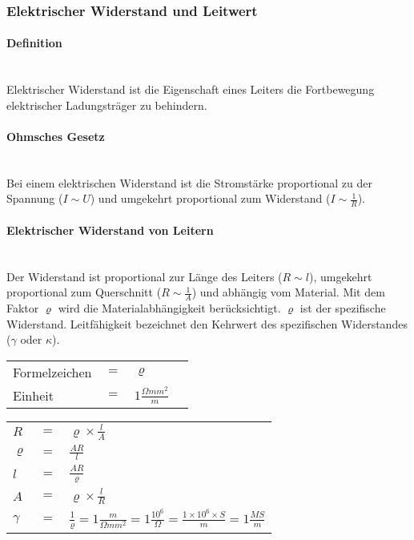 	\subsubsection{Elektrischer Widerstand und Leitwert}
		\paragraph{Definition}~\\

\noindent Elektrischer Widerstand ist die Eigenschaft eines Leiters die Fortbewegung elektrischer Ladungsträger zu behindern.

		\paragraph{Ohmsches Gesetz}~\\
		
\noindent Bei einem elektrischen Widerstand ist die Stromstärke proportional zu der Spannung ($I \sim U$) und umgekehrt proportional zum Widerstand ($I \sim \frac{1}{R}$).

		\paragraph{Elektrischer Widerstand von Leitern}~\\
		
\noindent Der Widerstand ist proportional zur Länge des Leiters ($R \sim l$), umgekehrt proportional zum Querschnitt ($R \sim \frac{1}{A}$) und abhängig vom Material. Mit dem Faktor $\varrho$ wird die Materialabhängigkeit berücksichtigt. $\varrho$ ist der spezifische Widerstand. Leitfähigkeit bezeichnet den Kehrwert des spezifischen Widerstandes ($\gamma$ oder $\kappa$).\\

\begin{tabular}{llll}
Formelzeichen	& $=$ & $\varrho$ &\\
Einheit			& $=$ & $1\frac{\Omega mm^2}{m	}$ &\\
\end{tabular}\newline

\begin{tabular}{lll}
$R$			& $=$ & $\varrho\times\frac{l}{A}$\\
$\varrho$	& $=$ & $\frac{AR}{l}$\\
$l$			& $=$ & $\frac{AR}{\varrho}$\\
$A$			& $=$ & $\varrho\times\frac{l}{R}$\\
$\gamma$		& $=$ & $\frac{1}{\varrho} = 1\frac{m}{\Omega mm^2} = 1\frac{10^6}{\Omega} = \frac{1\times 10^6\times S}{m} = 1\frac{MS}{m}$
\end{tabular}


